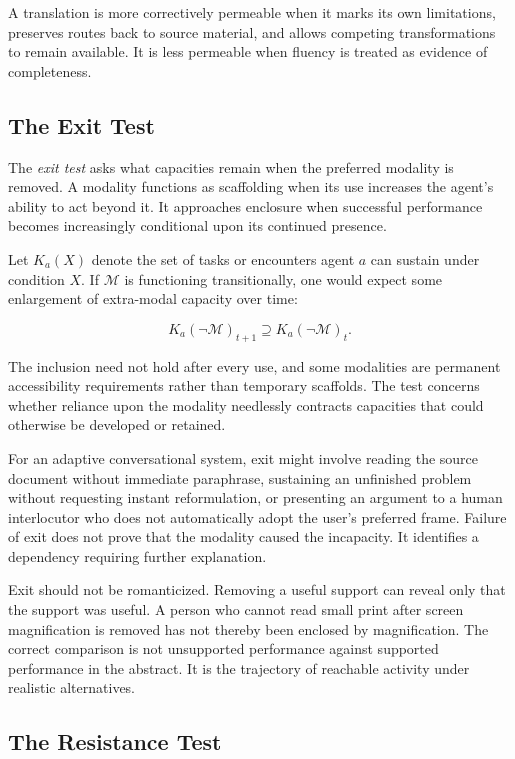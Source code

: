 \documentclass[11pt]{article}
\newcommand{\term}[1]{\emph{#1}}
\newcommand{\modality}{\mathcal{M}}
\begin{document}
A translation is more correctively permeable when it marks its own
limitations, preserves routes back to source material, and allows competing
transformations to remain available. It is less permeable when fluency is
treated as evidence of completeness.

\subsection{The Exit Test}

The \term{exit test} asks what capacities remain when the preferred modality is
removed. A modality functions as scaffolding when its use increases the
agent's ability to act beyond it. It approaches enclosure when successful
performance becomes increasingly conditional upon its continued presence.

Let \(K_a(X)\) denote the set of tasks or encounters agent \(a\) can sustain
under condition \(X\). If \(\modality\) is functioning transitionally, one
would expect some enlargement of extra-modal capacity over time:

\begin{equation}
  K_a(\neg\modality)_{t+1}
  \supseteq
  K_a(\neg\modality)_t.
  \label{eq:exit-capacity}
\end{equation}

The inclusion need not hold after every use, and some modalities are permanent
accessibility requirements rather than temporary scaffolds. The test concerns
whether reliance upon the modality needlessly contracts capacities that could
otherwise be developed or retained.

For an adaptive conversational system, exit might involve reading the source
document without immediate paraphrase, sustaining an unfinished problem
without requesting instant reformulation, or presenting an argument to a
human interlocutor who does not automatically adopt the user's preferred
frame. Failure of exit does not prove that the modality caused the incapacity.
It identifies a dependency requiring further explanation.

Exit should not be romanticized. Removing a useful support can reveal only
that the support was useful. A person who cannot read small print after
screen magnification is removed has not thereby been enclosed by
magnification. The correct comparison is not unsupported performance against
supported performance in the abstract. It is the trajectory of reachable
activity under realistic alternatives.

\subsection{The Resistance Test}
\end{document}
